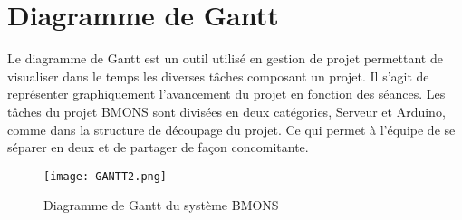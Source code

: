 \clearpage

\section{Diagramme de Gantt}
\vspace{1.5cm}
Le diagramme de Gantt est un outil utilisé en gestion de projet permettant de visualiser dans le temps les diverses tâches composant un projet. Il s'agit de représenter graphiquement l'avancement du projet en fonction des séances. Les tâches du projet BMONS sont divisées en deux catégories, Serveur et Arduino, comme dans la structure de découpage du projet. Ce qui permet à l'équipe de se séparer en deux et de partager de façon concomitante.
\vspace{1.5cm}
\begin{figure}[h!]
\centering\texttt{[image: GANTT2.png]}
\caption{\label{fig:GANTT} Diagramme de Gantt du système BMONS}
\end{figure}


